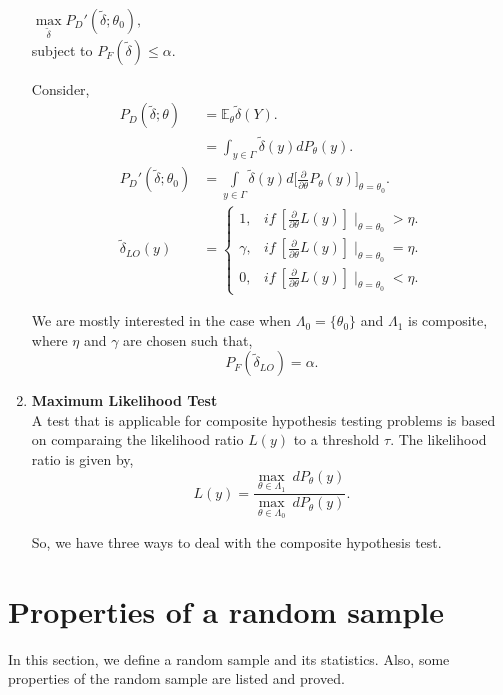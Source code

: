 \documentclass[a4paper,english,12pt]{article}
\begin{document}
\begin{enumerate}
\begin{center}
$\max\limits_{\tilde{\delta}} P_{D}'(\tilde{\delta};\theta_0),$ \\ subject to $	P_F(\tilde{\delta}) \leq \alpha$.
\end{center}

Consider,
\begin{align}
P_D(\tilde{ \delta};\theta) &= \mathbb{E}_\theta \tilde{ \delta}(Y). \nonumber \\
&= \int_{y \in \Gamma}  \tilde{\delta}(y) dP_\theta(y). \nonumber \\
P_{D}'(\tilde{ \delta};\theta_0) &=  \int\limits_{y \in \Gamma}  \tilde{\delta}(y) d\Bigg[\frac{\partial}{\partial \theta}P_\theta(y)\Bigg]_{\theta = \theta_0}. \nonumber \\
\tilde{\delta}_{LO}(y) &= 
\begin{cases} 
1, &if~ [\frac{\partial}{\partial \theta}L(y) ] \mid_{\theta = \theta_0} > \eta. \\
\gamma, &if~ [\frac{\partial}{\partial \theta}L(y)] \mid_{\theta = \theta_0} = \eta. \\
0, &if~ [\frac{\partial}{\partial \theta}L(y) ] \mid_{\theta = \theta_0} < \eta.
\end{cases}
\end{align}

We are mostly interested in the case when $\Lambda_0 = \{\theta_0\}$ and $\Lambda_1$ is composite, where $\eta$ and $\gamma$ are chosen such that, 
\begin{equation*}
P_F(\tilde{\delta}_{LO}) = \alpha.
\end{equation*}

\item \textbf{Maximum Likelihood Test}\\
A test that is applicable for composite hypothesis testing problems is based on comparaing the likelihood ratio $ L(y)$ to a threshold $\tau$. The likelihood ratio is given by,
\begin{equation}
L(y)=\dfrac{\max\limits_{\theta \in \Lambda_1} ~ dP_\theta(y)}{\max\limits_{\theta \in \Lambda_0} ~ dP_\theta(y)}. 
\end{equation}

So, we have three ways to deal with the composite hypothesis test.
\end{enumerate}

\section{Properties of a random sample}
In this section, we define a random sample and its statistics. Also, some properties of the random sample are listed and proved.
\end{document}

